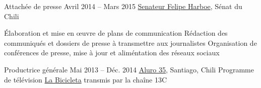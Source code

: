 \begin{joblist}
{		%
	}



\item[Attachée de presse]{Avril 2014 -- Mars 2015}
     { \href{https://www.harboe.cl/}{Senateur Felipe Harboe}, Sénat du Chili } 
	 {
                
		\iftbftiny \vspace{-0.5cm} \fi
			\begin{itemize}
			  \iftbftiny \setlength\itemsep{-3pt} \fi
			  \cvitem[\checkmark] Élaboration et mise en œuvre de plans de communication
			  \cvitem[\checkmark] Rédaction des communiqués et dossiers de presse à transmettre aux journalistes
			  \cvitem[\checkmark] Organisation de conférences de presse, mise à jour et aliméntation des réseaux sociaux
			\end{itemize}     
			
	}
    
    
    
\item[Productrice générale]{Mai 2013 -- Déc. 2014}
     {\href{https://www.aluro35.com/}  {Aluro 35}, Santiago, Chili}
     {Programme de télévision \href{http://www.13.cl/c/programas/la-bicicleta}{La Bicicleta} transmis par la chaîne 13C \\
			
}
\end{joblist}
